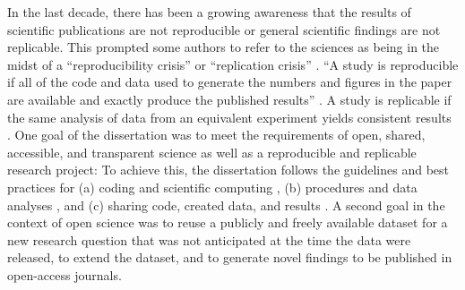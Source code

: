 In the last decade, there has been a growing awareness that the results of
scientific publications are not reproducible or general scientific findings are
not replicable.
%
This prompted some authors to refer to the sciences as being in the midst of a
``reproducibility crisis'' or ``replication crisis''
\citep{baker2016reproducibility, plesser2018reproducibility,
stupple2019reproducibility, nosek2022replicability}.
``A study is reproducible if all of the code and data used to generate the
numbers and figures in the paper are available and exactly produce the published
results'' \citep[][p. 111]{leek2017most}.
A study is replicable if the same analysis of data from an equivalent experiment
yields consistent results \citep{dubois2016building, leek2017most}.
%
One goal of the dissertation was to meet the requirements of open, shared,
accessible, and transparent science \citep[cf.][]{watson2015will,
fecher2014open} as well as a reproducible and replicable research project:
%
To achieve this, the dissertation follows the guidelines and best practices for
(a) coding and scientific computing \citep{wilson2014best}, (b) procedures and
data analyses \citep{nichols2017best, poldrack2017scanning,
poldrack2019establishment}, and (c) sharing code, created data, and results
\citep{eglen2017toward, nichols2017best, pernet2015improving}.
A second goal in the context of open science was to reuse a publicly and freely
available dataset for a new research question that was not anticipated at the
time the data were released, to extend the dataset, and to generate novel
findings to be published in open-access journals.

